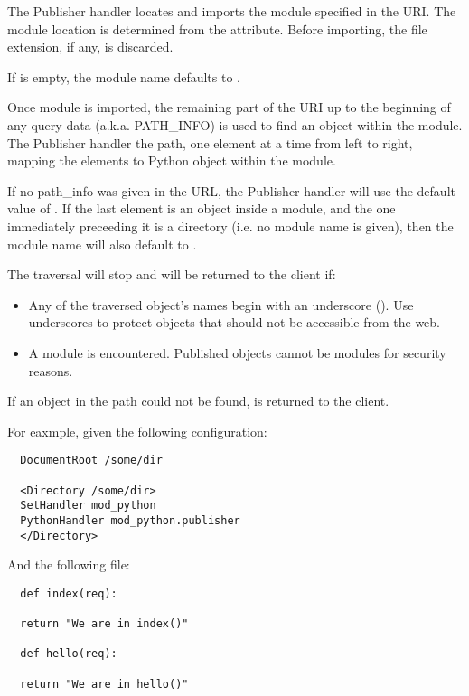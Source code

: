 The Publisher handler locates and imports the module specified in the
URI. The module location is determined from the 
attribute. Before importing, the file extension, if any, is
discarded. 

If  is empty, the module name defaults to
.

Once module is imported, the remaining part of the URI up to the
beginning of any query data (a.k.a. PATH_INFO) is used to find an
object within the module. The Publisher handler  the 
path, one element at a time from left to right, mapping the elements
to Python object within the module.

If no path_info was given in the URL, the Publisher handler will use
the default value of . If the last element is an object inside
a module, and the one immediately preceeding it is a directory
(i.e. no module name is given), then the module name will also default
to .

The traversal will stop and  will be returned to
the client if:

\begin{itemize}

\item
  Any of the traversed object's names begin with an underscore
  (\samp{\_}). Use underscores to protect objects that should not be
  accessible from the web.

\item
  A module is encountered. Published objects cannot be modules for
  security reasons.

\end{itemize}

If an object in the path could not be found, 
is returned to the client.

For eaxmple, given the following configuration:

\begin{verbatim}
  DocumentRoot /some/dir

  <Directory /some/dir>
  SetHandler mod_python
  PythonHandler mod_python.publisher
  </Directory>
\end{verbatim}

And the following  file:

\begin{verbatim}
  def index(req):

  return "We are in index()"

  def hello(req):

  return "We are in hello()"
\end{verbatim}

